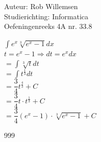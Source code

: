 \documentclass[a4paper]{article}
\newcommand{\dint}{\displaystyle\int}
\begin{document}
\noindent \large Auteur: Rob Willemsen \\
\noindent \large Studierichting: Informatica \\
\noindent \large Oefeningenreeks 4A nr. 33.8 \\

\medskip

\normalsize

$\dint e^x \sqrt[3]{e^x-1} dx$ \\

$t = e^x-1 \Rightarrow dt = e^x dx$ \\

$= \dint \sqrt[3]{t} dt$ \\

$= \dint t^{\tfrac{1}{3}} dt$ \\

$= \dfrac{3}{4}t^{\tfrac{4}{3}} + C$ \\

$= \dfrac{3}{4}t \cdot t^{\tfrac{1}{3}} + C$ \\

$= \dfrac{3}{4}(e^x-1) \cdot \sqrt[3]{e^x-1} + C$ \\

\begin{thebibliography}{999}
\end{thebibliography}
\end{document}
